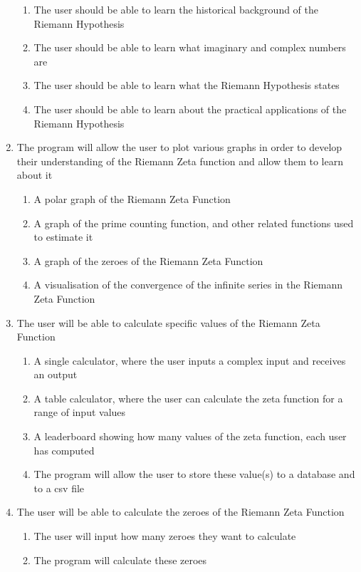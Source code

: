 \documentclass[12pt]{article}
\begin{document}
\begin{enumerate}
    \begin{enumerate}
        \item The user should be able to learn the historical background of the Riemann Hypothesis
        \item The user should be able to learn what imaginary and complex numbers are
        \item The user should be able to learn what the Riemann Hypothesis states
        \item The user should be able to learn about the practical applications of the Riemann Hypothesis
    \end{enumerate}
    \item The program will allow the user to plot various graphs in order to develop their understanding of the Riemann Zeta function and allow them to learn about it
    \begin{enumerate}
        \item A polar graph of the Riemann Zeta Function
        \item A graph of the prime counting function, and other related functions used to estimate it
        \item A graph of the zeroes of the Riemann Zeta Function
        \item A visualisation of the convergence of the infinite series in the Riemann Zeta Function
    \end{enumerate}
    \item The user will be able to calculate specific values of the Riemann Zeta Function
    \begin{enumerate}
        \item A single calculator, where the user inputs a complex input and receives an output
        \item A table calculator, where the user can calculate the zeta function for a range of input values
        \item A leaderboard showing how many values of the zeta function, each user has computed
        \item The program will allow the user to store these value(s) to a database and to a csv file
    \end{enumerate}
    \item The user will be able to calculate the zeroes of the Riemann Zeta Function
    \begin{enumerate}
        \item The user will input how many zeroes they want to calculate
        \item The program will calculate these zeroes

\end{enumerate}
\end{enumerate}
\end{document}
